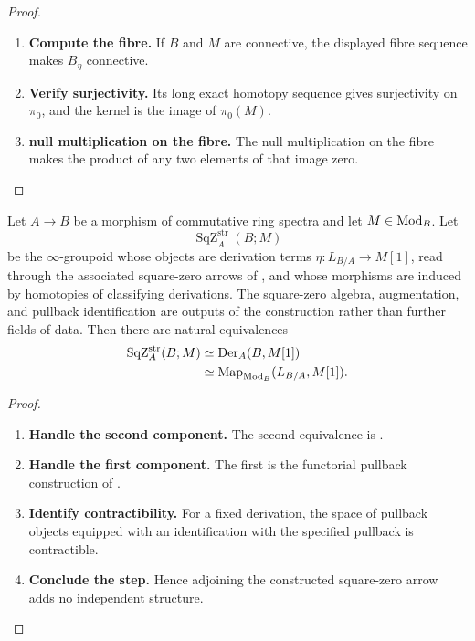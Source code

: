 \begin{proof}
\begin{enumerate}[label=\textup{(\arabic*)}]
    \item \textbf{Compute the fibre.}
    If \(B\) and \(M\) are connective, the displayed fibre sequence makes
    \(B_\eta\) connective.

    \item \textbf{Verify surjectivity.}
    Its long exact homotopy sequence gives surjectivity on \(\pi_0\), and the kernel is the
    image of \(\pi_0(M)\).

    \item \textbf{null multiplication on the fibre.}
    The null multiplication on the fibre makes the product of any two elements of that image
    zero.
\end{enumerate}
\end{proof}

\begin{theorem}
\label{thm:structured-square-zero-classification}
Let \(A\to B\) be a morphism of commutative ring spectra and let
\(M\in\operatorname{Mod}_B\). Let
\[
    \operatorname{SqZ}^{\mathrm{str}}_A(B;M)
\]
be the \(\infty\)-groupoid whose objects are derivation terms
\(\eta:L_{B/A}\to M[1]\), read through the associated square-zero arrows of
, and whose morphisms are induced by
homotopies of classifying derivations. The square-zero algebra, augmentation,
and pullback identification are outputs of the construction rather than
further fields of data. Then there are natural equivalences
\[
\begin{aligned}
    \operatorname{SqZ}^{\mathrm{str}}_A(B;M)
    &\simeq
    \operatorname{Der}_A(B,M[1])
    \\
    &\simeq
    \operatorname{Map}_{\operatorname{Mod}_B}(L_{B/A},M[1]).
\end{aligned}
\]
\end{theorem}

\begin{proof}
\leavevmode
\begin{enumerate}[label=\textup{(\arabic*)}]
    \item \textbf{Handle the second component.}
    The second equivalence is .

    \item \textbf{Handle the first component.}
    The first is the functorial pullback construction of
    .

    \item \textbf{Identify contractibility.}
    For a fixed derivation, the space of pullback objects equipped with an identification with
    the specified pullback is contractible.

    \item \textbf{Conclude the step.}
    Hence adjoining the constructed square-zero arrow adds no independent structure.
\end{enumerate}
\end{proof}

